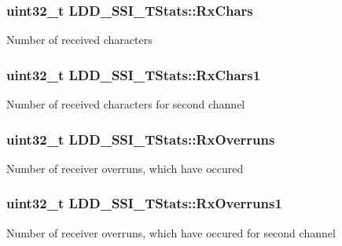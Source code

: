 \subsubsection[{\texorpdfstring{Rx\+Chars}{RxChars}}]{\setlength{\rightskip}{0pt plus 5cm}uint32\+\_\+t L\+D\+D\+\_\+\+S\+S\+I\+\_\+\+T\+Stats\+::\+Rx\+Chars}\hypertarget{struct_l_d_d___s_s_i___t_stats_ac77cdfd687b197b589fbcd43856aeb98}{}\label{struct_l_d_d___s_s_i___t_stats_ac77cdfd687b197b589fbcd43856aeb98}
Number of received characters 
\subsubsection[{\texorpdfstring{Rx\+Chars1}{RxChars1}}]{\setlength{\rightskip}{0pt plus 5cm}uint32\+\_\+t L\+D\+D\+\_\+\+S\+S\+I\+\_\+\+T\+Stats\+::\+Rx\+Chars1}\hypertarget{struct_l_d_d___s_s_i___t_stats_ae5221a07e2a6ad3907c34007693dbc55}{}\label{struct_l_d_d___s_s_i___t_stats_ae5221a07e2a6ad3907c34007693dbc55}
Number of received characters for second channel 
\subsubsection[{\texorpdfstring{Rx\+Overruns}{RxOverruns}}]{\setlength{\rightskip}{0pt plus 5cm}uint32\+\_\+t L\+D\+D\+\_\+\+S\+S\+I\+\_\+\+T\+Stats\+::\+Rx\+Overruns}\hypertarget{struct_l_d_d___s_s_i___t_stats_aa2125ae18425d2e4bd193b1ee434c8d9}{}\label{struct_l_d_d___s_s_i___t_stats_aa2125ae18425d2e4bd193b1ee434c8d9}
Number of receiver overruns, which have occured 
\subsubsection[{\texorpdfstring{Rx\+Overruns1}{RxOverruns1}}]{\setlength{\rightskip}{0pt plus 5cm}uint32\+\_\+t L\+D\+D\+\_\+\+S\+S\+I\+\_\+\+T\+Stats\+::\+Rx\+Overruns1}\hypertarget{struct_l_d_d___s_s_i___t_stats_af0efb66c36bfe377efb18e6ab2fe4559}{}\label{struct_l_d_d___s_s_i___t_stats_af0efb66c36bfe377efb18e6ab2fe4559}
Number of receiver overruns, which have occured for second channel 
